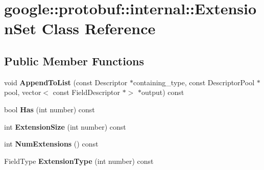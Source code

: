 \hypertarget{classgoogle_1_1protobuf_1_1internal_1_1ExtensionSet}{}\section{google\+:\+:protobuf\+:\+:internal\+:\+:Extension\+Set Class Reference}
\label{classgoogle_1_1protobuf_1_1internal_1_1ExtensionSet}
\subsection*{Public Member Functions}
\begin{DoxyCompactItemize}
\item 
\mbox{\label{classgoogle_1_1protobuf_1_1internal_1_1ExtensionSet_ad255032b4dbcc0ec95e5b274dd3d65c3}} 
void {\bfseries Append\+To\+List} (const Descriptor $\ast$containing\+\_\+type, const Descriptor\+Pool $\ast$pool, vector$<$ const Field\+Descriptor $\ast$$>$ $\ast$output) const
\item 
\mbox{\label{classgoogle_1_1protobuf_1_1internal_1_1ExtensionSet_a6cefea999fe5fa26825b8ddc1f64c561}} 
bool {\bfseries Has} (int number) const
\item 
\mbox{\label{classgoogle_1_1protobuf_1_1internal_1_1ExtensionSet_a081b112e7fb32af0c7e129128103d502}} 
int {\bfseries Extension\+Size} (int number) const
\item 
\mbox{\label{classgoogle_1_1protobuf_1_1internal_1_1ExtensionSet_af3bf15863a27f5913526d479faafc6ea}} 
int {\bfseries Num\+Extensions} () const
\item 
\mbox{\label{classgoogle_1_1protobuf_1_1internal_1_1ExtensionSet_a2c2379e800b86cc25a430a08739bc98e}} 
Field\+Type {\bfseries Extension\+Type} (int number) const
\item 
\mbox{\label{classgoogle_1_1protobuf_1_1internal_1_1ExtensionSet_ab3360132f182f928831434f953f1672f}} 
$$
\end{DoxyCompactItemize}
